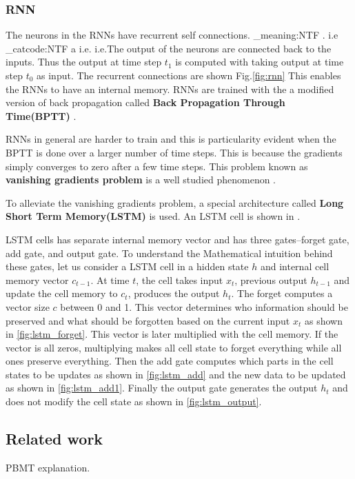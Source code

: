 \documentclass[conference]{IEEEtran}
\makeatletter
\newcommand\latinabbrev[1]{
  \peek_meaning:NTF . {%
    #1\@}%
  { \peek_catcode:NTF a {%
      #1.\@ }%
    {#1.\@}}}
\def\ie{\latinabbrev{i.e}}
\makeatother
\begin{document}
\subsubsection{RNN}
The neurons in the RNNs have recurrent self connections. \ie The output of the neurons are connected back to the inputs. Thus the output at time step $t_1$ is computed with taking output at time step $t_0$ as input. The recurrent connections are shown Fig.\ref{fig:rnn} This enables the RNNs to have an internal memory. RNNs are trained with the a modified version of back propagation called \textbf{Back Propagation Through Time(BPTT)}  \cite{werbos1990backpropagation}.

RNNs in general are harder to train and this is particularity evident when the BPTT is done over a larger number of time steps. This is because the gradients simply converges to zero after a few time steps. This problem known as \textbf{vanishing gradients problem} is a well studied phenomenon \cite{bengio1994learning}.  

To alleviate the vanishing gradients problem, a special architecture called \textbf{Long Short Term Memory(LSTM)} \cite{hochreiter1997long} is used. An LSTM cell is shown in \label{fig:lstm}.

LSTM cells has separate internal memory vector and has three gates--forget gate, add gate, and output gate. To understand the Mathematical intuition behind these gates, let us consider a LSTM cell in a hidden state $h$ and internal cell memory vector $c_{t-1}$. At time $t$, the cell takes input $x_t$, previous output $h_{t-1}$ and update the cell memory to $c_{t}$, produces the output $h_{t}$. The forget computes a vector size $c$ between 0 and 1. This vector determines who information should be preserved and what should be forgotten based on the current input $x_t$ as shown in \ref{fig:lstm_forget}. This vector is later multiplied with the cell memory. If the vector is all zeros, multiplying makes all cell state to forget everything while all ones preserve everything. Then the add gate computes which parts in the cell states to be updates as shown in  \ref{fig:lstm_add} and the new data to be updated as shown in \ref{fig:lstm_add1}. Finally the output gate generates the output $h_t$ and does not modify the cell state as shown in \ref{fig:lstm_output}.




\subsection{Related work}
PBMT explanation. \cite{koehn2003statistical} 
\end{document}
